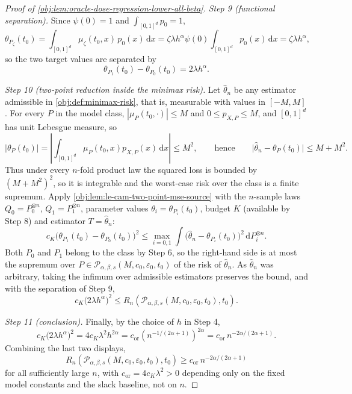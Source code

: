 \documentclass[11pt]{article}
\begin{document}
\begin{proof}[Proof of \cref{obj:lem:oracle-dose-regression-lower-all-beta}]
\emph{Step 9 (functional separation).} Since \(\psi(0)=1\) and \(\int_{[0,1]^d}p_0=1\),
\[
\theta_{P_\zeta}(t_0)
=
\int_{[0,1]^d}\mu_\zeta(t_0,x)\,p_0(x)\,\mathrm dx
=
\zeta\lambda h^{\alpha}\psi(0)\int_{[0,1]^d}p_0(x)\,\mathrm dx
=
\zeta\lambda h^{\alpha},
\]
so the two target values are separated by
\[
\theta_{P_1}(t_0)-\theta_{P_0}(t_0)
=
2\lambda h^{\alpha}.
\]

\emph{Step 10 (two-point reduction inside the minimax risk).} Let \(\hat\theta_n\) be any estimator
admissible in \cref{obj:def:minimax-risk}, that is, measurable with values in \([-M,M]\). For every
\(P\) in the model class, \(|\mu_P(t_0,\cdot)|\le M\) and \(0\le p_{X,P}\le M\), and \([0,1]^d\) has
unit Lebesgue measure, so
\[
|\theta_P(t_0)|
=
\left|\int_{[0,1]^d}\mu_P(t_0,x)p_{X,P}(x)\,\mathrm dx\right|
\le
M^2,
\qquad\text{hence}\qquad
\bigl|\hat\theta_n-\theta_P(t_0)\bigr|\le M+M^2 .
\]
Thus under every \(n\)-fold product law the squared loss is bounded by \((M+M^2)^2\), so it is
integrable and the worst-case risk over the class is a finite supremum. Apply
\cref{obj:lem:le-cam-two-point-mse-source} with the \(n\)-sample laws \(Q_0=P_0^{\otimes n}\),
\(Q_1=P_1^{\otimes n}\), parameter values \(\theta_i=\theta_{P_i}(t_0)\), budget \(K\) (available by
Step 8) and estimator \(T=\hat\theta_n\):
\[
c_K\bigl(\theta_{P_1}(t_0)-\theta_{P_0}(t_0)\bigr)^2
\le
\max_{i=0,1}
\int\bigl(\hat\theta_n-\theta_{P_i}(t_0)\bigr)^2\,\mathrm dP_i^{\otimes n} .
\]
Both \(P_0\) and \(P_1\) belong to the class by Step 6, so the right-hand side is at most the
supremum over \(P\in\mathcal P_{\alpha,\beta,s}(M,c_0,\varepsilon_0,t_0)\) of the risk of
\(\hat\theta_n\). As \(\hat\theta_n\) was arbitrary, taking the infimum over admissible estimators
preserves the bound, and with the separation of Step 9,
\[
c_K\bigl(2\lambda h^{\alpha}\bigr)^2
\le
R_n\!\left(\mathcal P_{\alpha,\beta,s}(M,c_0,\varepsilon_0,t_0),t_0\right).
\]

\emph{Step 11 (conclusion).} Finally, by the choice of \(h\) in Step 4,
\[
c_K\bigl(2\lambda h^{\alpha}\bigr)^2
=
4c_K\lambda^2h^{2\alpha}
=
c_{\mathrm{or}}\left(n^{-1/(2\alpha+1)}\right)^{2\alpha}
=
c_{\mathrm{or}}\,n^{-2\alpha/(2\alpha+1)} .
\]
Combining the last two displays,
\[
R_n\!\left(\mathcal P_{\alpha,\beta,s}(M,c_0,\varepsilon_0,t_0),t_0\right)
\ge
c_{\mathrm{or}}\,n^{-2\alpha/(2\alpha+1)}
\]
for all sufficiently large \(n\), with \(c_{\mathrm{or}}=4c_K\lambda^2>0\) depending only on the
fixed model constants and the slack baseline, not on \(n\).
\end{proof}
\end{document}

